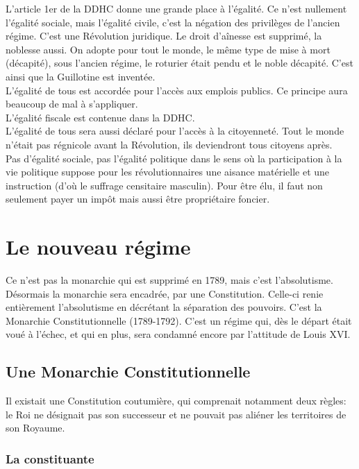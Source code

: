 \documentclass[10pt, a4paper, openany]{book}
\begin{document}
L'article 1er de la DDHC donne une grande place à l'égalité. Ce n'est nullement l'égalité sociale, mais l'égalité civile, c'est la négation des privilèges de l'ancien régime. C'est une Révolution juridique. Le droit d'aînesse est supprimé, la noblesse aussi. On adopte pour tout le monde, le même type de mise à mort (décapité), sous l'ancien régime, le roturier était pendu et le noble décapité. C'est ainsi que la Guillotine est inventée. \\
L'égalité de tous est accordée pour l'accès aux emplois publics. Ce principe aura beaucoup de mal à s'appliquer. \\
L'égalité fiscale est contenue dans la DDHC. \\
L'égalité de tous sera aussi déclaré pour l'accès à la citoyenneté. Tout le monde n'était pas régnicole avant la Révolution, ils deviendront tous citoyens après. \\
Pas d'égalité sociale, pas l'égalité politique dans le sens où la participation à la vie politique suppose pour les révolutionnaires une aisance matérielle et une instruction (d'où le suffrage censitaire masculin). Pour être élu, il faut non seulement payer un impôt mais aussi être propriétaire foncier. 

\section{Le nouveau régime}

Ce n'est pas la monarchie qui est supprimé en 1789, mais c'est l'absolutisme. Désormais la monarchie sera encadrée, par une Constitution. Celle-ci renie entièrement l'absolutisme en décrétant la séparation des pouvoirs. C'est la Monarchie Constitutionnelle (1789-1792). C'est un régime qui, dès le départ était voué à l'échec, et qui en plus, sera condamné encore par l'attitude de Louis XVI. 

\subsection{Une Monarchie Constitutionnelle}

Il existait une Constitution coutumière, qui comprenait notamment deux règles: le Roi ne désignait pas son successeur et ne pouvait pas aliéner les territoires de son Royaume.

\subsubsection{La constituante}
\end{document}
